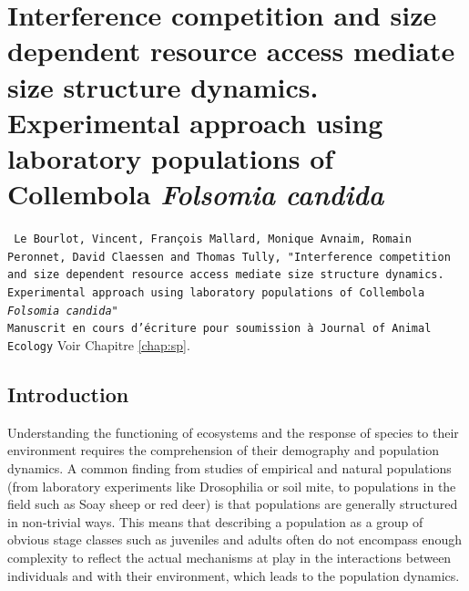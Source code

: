 \chapter{Interference competition and size dependent resource
access mediate size structure dynamics. Experimental approach using laboratory
populations of Collembola \textit{Folsomia candida}}\label{Ann:SP}

\vspace{2cm}

\begin{Spacing}{1}
\texttt{
Le Bourlot, Vincent, François Mallard, Monique Avnaim, Romain Peronnet, David
Claessen and Thomas Tully, "Interference competition and size dependent resource
access mediate size structure dynamics. Experimental approach using laboratory
populations of Collembola \textit{Folsomia candida}"\\
Manuscrit en cours d'écriture pour soumission à Journal of Animal Ecology}
Voir Chapitre \ref{chap:sp}.
\end{Spacing}


\section{Introduction}

Understanding the functioning of ecosystems and the response of species to their
environment requires the comprehension of their demography and population
dynamics. A common finding from studies of empirical and natural populations
(from laboratory experiments like Drosophilia  or soil mite, to populations in
the field such as Soay sheep  or red deer) is that populations are generally
structured in non-trivial ways.
This means that describing a population as a group of obvious stage classes such
as juveniles and adults often do not encompass enough complexity to reflect the
actual mechanisms at play in the interactions between individuals and with their
environment, which leads to the population dynamics.

